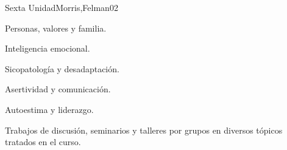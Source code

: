\begin{syllabus}
\begin{unit}{Sexta Unidad}{Morris,Felman}{0}{2}
\begin{topics}
	\item Personas, valores y familia.
	\item Inteligencia emocional.
	\item Sicopatología y desadaptación.
	\item Asertividad y comunicación.
	\item Autoestima y liderazgo.
\end{topics}
\begin{unitgoals}
	\item Trabajos de discusión, seminarios y talleres por grupos en diversos tópicos tratados en el curso.
\end{unitgoals}
\end{unit}



\begin{coursebibliography}
\end{coursebibliography}

\end{syllabus}
